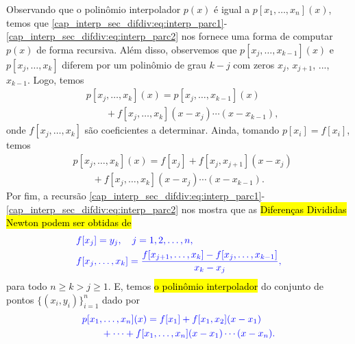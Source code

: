 Observando que o polinômio interpolador $p(x)$ é igual a $p[x_1,\dotsc,x_n](x)$, temos que \eqref{cap_interp_sec_difdiv:eq:interp_parc1}-\eqref{cap_interp_sec_difdiv:eq:interp_parc2} nos fornece uma forma de computar $p(x)$ de forma recursiva. Além disso, observemos que $p[x_j, \dotsc, x_{k-1}](x)$ e $p[x_j, \dotsc, x_k]$ diferem por um polinômio de grau $k-j$ com zeros $x_j$, $x_{j+1}$, ..., $x_{k-1}$. Logo, temos
\begin{equation}
  \begin{aligned}
    &p[x_j,\dotsc,x_k](x) = p[x_j,\dotsc,x_{k-1}](x) \\
    &\qquad + f[x_j,\dotsc,x_k](x-x_j)\cdots(x-x_{k-1}),
  \end{aligned}
\end{equation}
onde $f[x_j, \dotsc, x_k]$ são coeficientes a determinar. Ainda, tomando $p[x_i] = f[x_i]$, temos
\begin{equation}
  \begin{aligned}
    &p[x_j,\dotsc,x_k](x) = f[x_j] + f[x_j,x_{j+1}](x-x_j)\\
    &\qquad + f[x_j,\dotsc,x_k](x-x_j)\cdots(x-x_{k-1}).
  \end{aligned}
\end{equation}
Por fim, a recursão \eqref{cap_interp_sec_difdiv:eq:interp_parc1}-\eqref{cap_interp_sec_difdiv:eq:interp_parc2} nos mostra que as \hl{Diferenças Divididas Newton podem ser obtidas de}
\begin{subequations}\label{cap_interp_sec_difdiv:eq:interp_difdiv}\hleq
  \begin{align}
    &f[x_j] = y_j,\quad j = 1, 2, \dotsc, n,\\
    &f[x_j,\dotsc,x_k] = \frac{f[x_{j+1},\dotsc,x_k]-f[x_j,\dotsc,x_{k-1}]}{x_k-x_j},
  \end{align}
\end{subequations}
para todo $n\geq k > j \geq 1$. E, temos \hl{o polinômio interpolador} do conjunto de pontos $\{(x_i,y_i)\}_{i=1}^n$ dado por
\begin{equation}\label{cap_interp_sec_difdiv:eq:interpoli_Newton}\color{blue}\begin{aligned}
    &p[x_1,\dotsc,x_n](x) = f[x_1] + f[x_1,x_2](x-x_1) \\
    &\qquad + \cdots + f[x_1,\dotsc,x_n](x-x_1)\cdots(x-x_n).  
  \end{aligned}
\end{equation}


